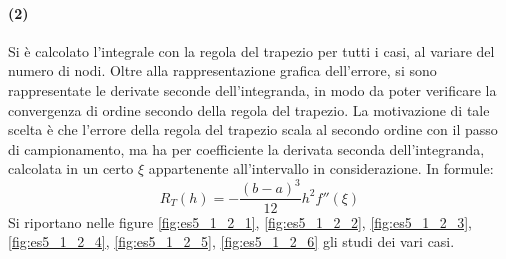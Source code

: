 \documentclass[letterpaper, 12pt]{article}
\begin{document}
\paragraph{(2) } Si è calcolato l'integrale con la regola del trapezio per tutti i casi, al variare del numero di
nodi. Oltre alla rappresentazione grafica dell'errore, si sono rappresentate le derivate seconde dell'integranda,
in modo da poter verificare la convergenza di ordine secondo della regola del trapezio. La motivazione
di tale scelta è che l'errore della regola del trapezio scala al secondo ordine con il passo di campionamento,
ma ha per coefficiente la derivata seconda dell'integranda, calcolata in un certo $\xi$ appartenente all'intervallo
in considerazione. In formule:
\[
R_T(h) = -\frac{(b-a)^3 }{12}h^2 f''(\xi)
\]
Si riportano nelle figure \ref{fig:es5_1_2_1}, \ref{fig:es5_1_2_2}, \ref{fig:es5_1_2_3}, 
\ref{fig:es5_1_2_4}, \ref{fig:es5_1_2_5}, \ref{fig:es5_1_2_6} gli studi dei vari casi.
\end{document}
